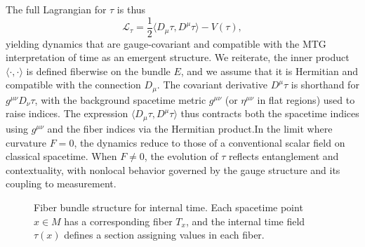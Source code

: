 \documentclass[11pt]{article}
\begin{document}
The full Lagrangian for \( \tau \) is thus
\begin{equation}
\mathcal{L}_\tau = \frac{1}{2} \langle D_\mu \tau, D^\mu \tau \rangle - V(\tau),
\end{equation}
yielding dynamics that are gauge-covariant and compatible with the MTG interpretation of time as an emergent structure. We reiterate, the inner product $\langle \cdot, \cdot \rangle$ is defined fiberwise on the bundle $E$, and we assume that it is Hermitian and compatible with the connection $D_\mu$. The covariant derivative $D^\mu \tau$ is shorthand for $g^{\mu\nu} D_\nu \tau$, with the background spacetime metric $g^{\mu\nu}$ (or $\eta^{\mu\nu}$ in flat regions) used to raise indices. The expression $\langle D_\mu \tau, D^\mu \tau \rangle$ thus contracts both the spacetime indices using $g^{\mu\nu}$ and the fiber indices via the Hermitian product.In the limit where curvature \( F = 0 \), the dynamics reduce to those of a conventional scalar field on classical spacetime. When \( F \neq 0 \), the evolution of \( \tau \) reflects entanglement and contextuality, with nonlocal behavior governed by the gauge structure and its coupling to measurement.
\begin{figure}[ht]
\centering
{}
\caption{Fiber bundle structure for internal time. Each spacetime point \( x \in M \) has a corresponding fiber \( T_x \), and the internal time field \( \tau(x) \) defines a section assigning values in each fiber.}
\label{fig:fiber_bundle}
\end{figure}
\end{document}
